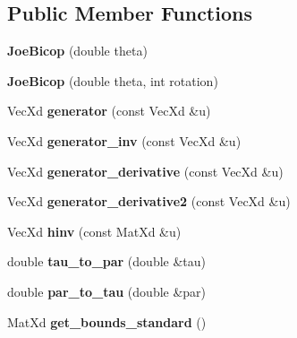 \subsection*{Public Member Functions}
\begin{DoxyCompactItemize}
\item 
\hypertarget{class_joe_bicop_a8ddf492ef634fd120f8cce963f32014a}{{\bfseries Joe\+Bicop} (double theta)}\label{class_joe_bicop_a8ddf492ef634fd120f8cce963f32014a}

\item 
\hypertarget{class_joe_bicop_aab8dd1d752753480a930b6fa82ed0f4b}{{\bfseries Joe\+Bicop} (double theta, int rotation)}\label{class_joe_bicop_aab8dd1d752753480a930b6fa82ed0f4b}

\item 
\hypertarget{class_joe_bicop_a3a9cd4684de97041f271ce1f40c32fa2}{Vec\+Xd {\bfseries generator} (const Vec\+Xd \&u)}\label{class_joe_bicop_a3a9cd4684de97041f271ce1f40c32fa2}

\item 
\hypertarget{class_joe_bicop_ad4d4ff3ee52eac61b526f10a8b12c400}{Vec\+Xd {\bfseries generator\+\_\+inv} (const Vec\+Xd \&u)}\label{class_joe_bicop_ad4d4ff3ee52eac61b526f10a8b12c400}

\item 
\hypertarget{class_joe_bicop_a9ee3b11b81ae825369fc1a82f922d480}{Vec\+Xd {\bfseries generator\+\_\+derivative} (const Vec\+Xd \&u)}\label{class_joe_bicop_a9ee3b11b81ae825369fc1a82f922d480}

\item 
\hypertarget{class_joe_bicop_a7613e4c3cd33efac94cf2d1ee7b9869d}{Vec\+Xd {\bfseries generator\+\_\+derivative2} (const Vec\+Xd \&u)}\label{class_joe_bicop_a7613e4c3cd33efac94cf2d1ee7b9869d}

\item 
\hypertarget{class_joe_bicop_a40102f50e0cd111ad75a46acdfbd80ac}{Vec\+Xd {\bfseries hinv} (const Mat\+Xd \&u)}\label{class_joe_bicop_a40102f50e0cd111ad75a46acdfbd80ac}

\item 
\hypertarget{class_joe_bicop_a3e0bd20eb4e01bf762a24fa73ca0ce52}{double {\bfseries tau\+\_\+to\+\_\+par} (double \&tau)}\label{class_joe_bicop_a3e0bd20eb4e01bf762a24fa73ca0ce52}

\item 
\hypertarget{class_joe_bicop_aac2914100c2a16efe169b392f328673c}{double {\bfseries par\+\_\+to\+\_\+tau} (double \&par)}\label{class_joe_bicop_aac2914100c2a16efe169b392f328673c}

\item 
\hypertarget{class_joe_bicop_adf082c40e8205a0602ae676df684e0a1}{Mat\+Xd {\bfseries get\+\_\+bounds\+\_\+standard} ()}\label{class_joe_bicop_adf082c40e8205a0602ae676df684e0a1}

\end{DoxyCompactItemize}
